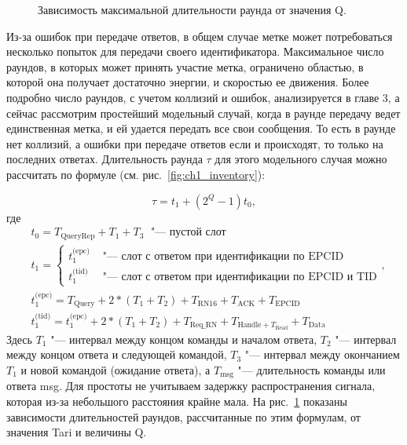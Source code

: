\begin{figure}[!t]
	\caption{Зависимость максимальной длительности раунда от значения Q.}
	\label{fig:ch2_round_durations}
\end{figure}


Из-за ошибок при передаче ответов, в общем случае метке может потребоваться несколько попыток для передачи своего идентификатора. Максимальное число раундов, в которых может принять участие метка, ограничено областью, в которой она получает достаточно энергии, и скоростью ее движения. Более подробно число раундов, с учетом коллизий и ошибок, анализируется в главе 3, а сейчас рассмотрим простейший модельный случай, когда в раунде передачу ведет единственная метка, и ей удается передать все свои сообщения. То есть в раунде нет коллизий, а ошибки при передаче ответов если и происходят, то только на последних ответах. Длительность раунда $\tau$ для этого модельного случая можно рассчитать по формуле (см. рис.~\ref{fig:ch1_inventory}):

$$
	\tau = t_1 + (2^Q - 1) t_0,
$$
где
$$
	\begin{aligned}
		&t_0 = T_{\text{QueryRep}} + T_1 + T_3\;\text{ "--- пустой слот}\\
		&t_1 = \begin{cases}
			t_1^{\text{(epc)}} &\text{ "--- слот с ответом при идентификации по EPCID}\\
			t_1^{\text{(tid)}} &\text{ "--- слот с ответом при идентификации по EPCID и TID}
		\end{cases},\\
		&t_1^{\text{(epc)}} = T_{\text{Query}} + 2 * (T_1 + T_2) + T_{\text{RN16}} +
			T_{\text{ACK}} + T_{\text{EPCID}}\\
		&t_1^{\text{(tid)}} = t_1^{\text{(epc)}} + 2 * (T_1 + T_2) + T_{\text{Req\_RN}} +
			T_{\text{Handle} + T_{\text{Read}}} + T_{\text{Data}}
	\end{aligned}
$$
Здесь $T_1$ "--- интервал между концом команды и началом ответа, $T_2$ "--- интервал между концом ответа и следующей командой, $T_3$ "--- интервал между окончанием $T_1$ и новой командой (ожидание ответа), а $T_{\text{msg}}$ "--- длительность команды или ответа msg. Для простоты не учитываем задержку распространения сигнала, которая из-за небольшого расстояния крайне мала. На рис.~\ref{fig:ch2_round_durations} показаны зависимости длительностей раундов, рассчитанные по этим формулам, от значения Tari и величины Q.

